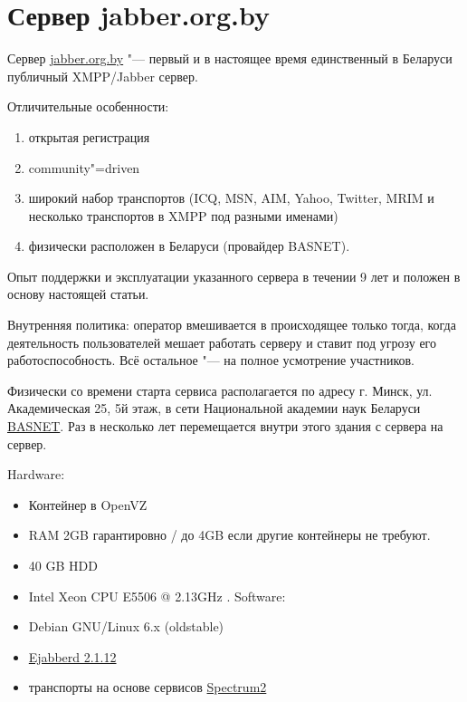 \documentclass[10pt, a5paper]{article}
\begin{document}
\section{Сервер jabber.org.by}

Сервер \href{http://jabber.org.by}{jabber.org.by} "--- первый и в настоящее время единственный в Беларуси публичный XMPP/Jabber сервер.

Отличительные особенности:

\begin{enumerate}
  \item открытая регистрация
  \item community"=driven
  \item широкий набор транспортов (ICQ, MSN, AIM, Yahoo, Twitter, MRIM и несколько транспортов в XMPP под разными именами)
  \item физически расположен в Беларуси (провайдер BASNET).
\end{enumerate}

Опыт поддержки и эксплуатации указанного сервера в течении 9 лет и положен в основу  настоящей статьи.

Внутренняя политика: оператор вмешивается в происходящее только тогда, когда деятельность пользователей мешает работать серверу и ставит под угрозу его работоспособность. Всё остальное "--- на полное усмотрение участников.

Физически со времени старта сервиса располагается по адресу г. Минск, ул. Академическая 25, 5й этаж, в сети Национальной академии наук Беларуси \href{http://basnet.by}{BASNET}. Раз в несколько лет перемещается внутри этого здания с сервера на сервер.

Hardware:

\begin{itemize}
  \item Контейнер в OpenVZ
  \item RAM 2GB гарантировно /  до 4GB если другие контейнеры не требуют.
  \item 40 GB HDD
  \item Intel\textregistered{} Xeon\textregistered{} CPU E5506  @ 2.13GHz . 
Software:
  \item Debian GNU/Linux 6.x (oldstable)
  \item \href{http://www.process"=one.net/en/ejabberd}{Ejabberd 2.1.12}
  \item транспорты на основе сервисов \href{http://spectrum.im}{Spectrum2}
\end{itemize}
\end{document}

